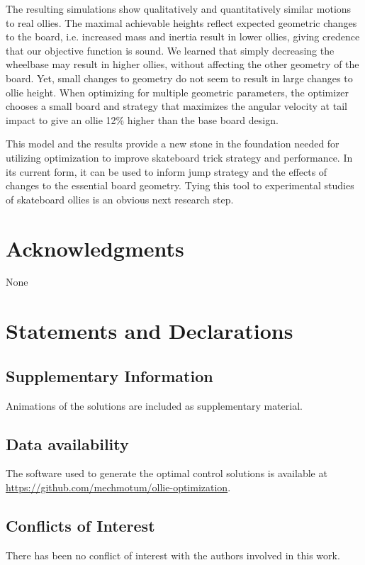 \documentclass[default,iicol]{sn-jnl}
\begin{document}
The resulting simulations show qualitatively and quantitatively similar motions to real ollies. The maximal achievable heights reflect expected geometric changes to the board, i.e. increased mass and inertia result in lower ollies, giving credence that our objective function is sound. We learned that simply decreasing the wheelbase may result in higher ollies, without affecting the other geometry of the board. Yet, small changes to geometry do not seem to result in large changes to ollie height. When optimizing for multiple geometric parameters, the optimizer chooses a small board and strategy that maximizes the angular velocity at tail impact to give an ollie 12\% higher than the base board design.

This model and the results provide a new stone in the foundation needed for utilizing optimization to improve skateboard trick strategy and performance. In its current form, it can be used to inform jump strategy and the effects of changes to the essential board geometry. Tying this tool to experimental studies of skateboard ollies is an obvious next research step.

\section{Acknowledgments}
None

\section{Statements and Declarations}

\subsection{Supplementary Information}
%
Animations of the solutions are included as supplementary material.

\subsection{Data availability}
%
The software used to generate the optimal control solutions is available at \url{https://github.com/mechmotum/ollie-optimization}.

\subsection{Conflicts of Interest}
%
There has been no conflict of interest with the
authors involved in this work.



\end{document}
